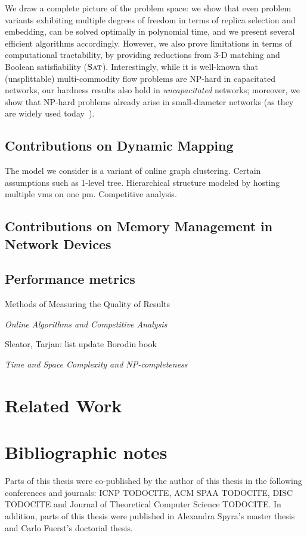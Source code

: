 We draw a complete picture of the problem space: we show that
even problem variants exhibiting multiple degrees of freedom in terms of
replica selection and embedding,
can be solved optimally in polynomial time, and we present several efficient
algorithms accordingly. However, we also prove limitations in terms of
computational tractability, by providing reductions from 3-D matching
and Boolean satisfiability ($\textsc{Sat}$). Interestingly,
while it is well-known that (unsplittable) multi-commodity flow
problems are NP-hard in capacitated networks, our hardness results also hold in \emph{uncapacitated}
networks; moreover, we show that NP-hard problems already arise in small-diameter networks (as they are
widely used today~\cite{fattree}).

\newpage

\subsection{Contributions on Dynamic Mapping}

The model we consider is a variant of online graph clustering.
Certain assumptions such as 1-level tree. Hierarchical structure modeled by hosting multiple vms on one pm.
Competitive analysis.

\subsection{Contributions on Memory Management in Network Devices}


\subsection{Performance metrics}



Methods of Measuring the Quality of Results

\emph{Online Algorithms and Competitive Analysis}

Sleator, Tarjan: list update \cite{competitive-analysis}
Borodin book \cite{borodin-book}

\emph{Time and Space Complexity and NP-completeness}


\section{Related Work}





\section{Bibliographic notes}

Parts of this thesis were co-published by the author of this thesis in the following conferences and journals: ICNP TODOCITE, ACM SPAA TODOCITE, DISC TODOCITE and Journal of Theoretical Computer Science TODOCITE.
In addition, parts of this thesis were published in Alexandra Spyra's master thesis and Carlo Fuerst's doctorial thesis.